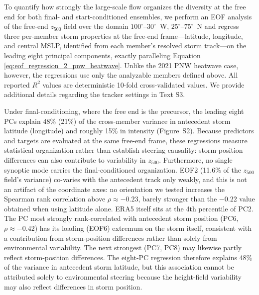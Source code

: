 \documentclass[final]{agujournal2019}
\begin{document}
To quantify how strongly the large-scale flow organizes the diversity at the free end for both final- and start-conditioned ensembles, we perform an EOF analysis of the free-end $z_{500}$ field over the domain $100^{\circ}$--$30^{\circ}$~W, $25^{\circ}$--$75^{\circ}$~N and regress three per-member storm properties at the free-end frame---latitude, longitude, and central MSLP, identified from each member's resolved storm track---on the leading eight principal components, exactly paralleling Equation \ref{eq:eof_regression_2_pnw_heatwave}. Unlike the 2021 PNW heatwave case, however, the regressions use only the analyzable members defined above. All reported $R^2$ values are deterministic 10-fold cross-validated values. We provide additional details regarding the tracker settings in Text S3.

Under final-conditioning, where the free end is the precursor, the leading eight PCs explain 48\% (21\%) of the cross-member variance in antecedent storm latitude (longitude) and roughly 15\% in intensity (Figure~S2). Because predictors and targets are evaluated at the same free-end frame, these regressions measure statistical organization rather than establish steering causality: storm-position differences can also contribute to variability in $z_{500}$. Furthermore, no single synoptic mode carries the final-conditioned organization. EOF2 (11.6\% of the $z_{500}$ field's variance) co-varies with the antecedent track only weakly, and this is not an artifact of the coordinate axes: no orientation we tested increases the Spearman rank correlation above $\rho \approx -0.23$, barely stronger than the $-0.22$ value obtained when using latitude alone. ERA5 itself sits at the 4th percentile of PC2. The PC most strongly rank-correlated with antecedent storm position (PC6, $\rho \approx -0.42$) has its loading (EOF6) extremum on the storm itself, consistent with a contribution from storm-position differences rather than solely from environmental variability. The next strongest (PC7, PC8) may likewise partly reflect storm-position differences. The eight-PC regression therefore explains 48\% of the variance in antecedent storm latitude, but this association cannot be attributed solely to environmental steering because the height-field variability may also reflect differences in storm position.
\end{document}

